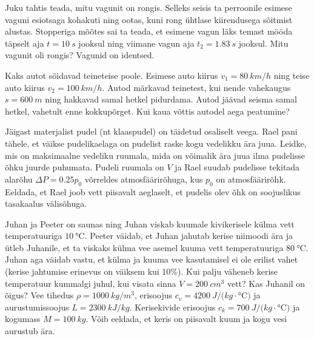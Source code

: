 \documentclass[10pt]{article}
\begin{document}
\setAuthor{}

Juku tahtis teada, mitu vagunit on rongis. Selleks seisis ta perroonile esimese vaguni esiotsaga kohakuti ning ootas, kuni rong ühtlase kiirendusega sõitmist alustas.
Stopperiga mõõtes sai ta teada, et esimene vagun läks temast mööda täpselt aja $t=\SI{10}{s}$ jooksul ning viimane vagun aja  $t_2 = \SI{1.83}{s}$ jooksul. Mitu vagunit oli rongis?
Vagunid on identsed.
\probend
\bigskip

\setAuthor{}

Kaks autot sõidavad teineteise poole. Esimese auto kiirus $v_1=\SI{80}{km/h}$ ning teise auto kiirus $v_2 = \SI{100}{km/h}$. Autod märkavad teinetest, kui nende vahekaugus $s=\SI{600}{m}$ ning hakkavad samal hetkel pidurdama. Autod jäävad seisma samal hetkel, vahetult enne kokkupõrget. Kui kaua võttis autodel aega peatumine?
\probend
\bigskip


Jäigast materjalist pudel (nt klaaspudel) on täidetud osaliselt veega. Rael pani tähele, et väikse pudelikaelaga on pudelist raske kogu vedelikku ära juua. Leidke, mis on maksimaalne vedeliku ruumala, mida on võimalik ära juua ilma pudelisse õhku juurde puhumata. Pudeli ruumala on $V$ ja Rael suudab pudelisse tekitada alarõhu $\Delta P=\num{0.25} p_0$ võrreldes atmosfäärirõhuga, kus $p_0$ on atmosfäärirõhk. Eeldada, et Rael joob vett piisavalt aeglaselt, et pudelis olev õhk on soojuslikus tasakaalus välisõhuga.
\probend
\bigskip

\setAuthor{}

Juhan ja Peeter on saunas ning Juhan viskab kuumale kivikerisele külma vett temperatuuriga $\SI{10}{\celsius}$. Peeter väidab, et Juhan jahutab kerise niimoodi ära ja ütleb Juhanile, et ta viskaks külma vee asemel kuuma vett temperatuuriga $\SI{80}{\celsius}$. Juhan aga väidab vastu, et külma ja kuuma vee kasutamisel ei ole erilist vahet (kerise jahtumise erinevus on väiksem kui 10\%). Kui palju väheneb kerise temperatuur kummalgi juhul, kui visata sinna $V=\SI{200}{cm^3}$ vett? Kas Juhanil on õigus? Vee tihedus $\rho=\SI{1000}{kg/m^3}$, erisoojus $c_v=\SI{4200}{J/(kg\cdot\celsius)}$ ja aurustumissoojus $L=\SI{2300}{kJ/kg}$. Kerisekivide erisoojus $c_k=\SI{700}{J/(kg\cdot\celsius)}$ ja kogumass $M=\SI{100}{kg}$. Võib eeldada, et keris on piisavalt kuum ja kogu vesi aurustub ära.
\probend
\bigskip
\end{document}
